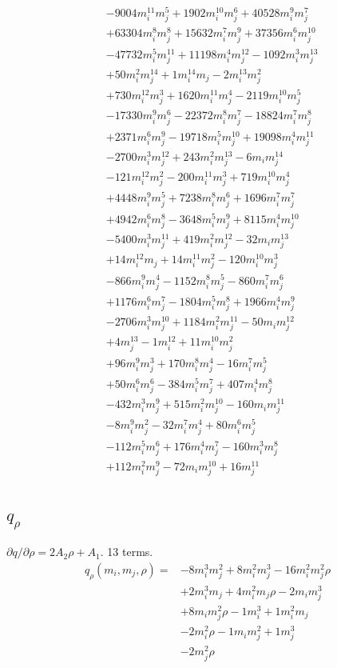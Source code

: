 {\begin{align*}
&-9004m_i^{11}m_j^{5}+1902m_i^{10}m_j^{6}+40528m_i^{9}m_j^{7}\\
&+63304m_i^{8}m_j^{8}+15632m_i^{7}m_j^{9}+37356m_i^{6}m_j^{10}\\
&-47732m_i^{5}m_j^{11}+11198m_i^{4}m_j^{12}-1092m_i^{3}m_j^{13}\\
&+50m_i^{2}m_j^{14}+1m_i^{14}m_j-2m_i^{13}m_j^{2}\\
&+730m_i^{12}m_j^{3}+1620m_i^{11}m_j^{4}-2119m_i^{10}m_j^{5}\\
&-17330m_i^{9}m_j^{6}-22372m_i^{8}m_j^{7}-18824m_i^{7}m_j^{8}\\
&+2371m_i^{6}m_j^{9}-19718m_i^{5}m_j^{10}+19098m_i^{4}m_j^{11}\\
&-2700m_i^{3}m_j^{12}+243m_i^{2}m_j^{13}-6m_im_j^{14}\\
&-121m_i^{12}m_j^{2}-200m_i^{11}m_j^{3}+719m_i^{10}m_j^{4}\\
&+4448m_i^{9}m_j^{5}+7238m_i^{8}m_j^{6}+1696m_i^{7}m_j^{7}\\
&+4942m_i^{6}m_j^{8}-3648m_i^{5}m_j^{9}+8115m_i^{4}m_j^{10}\\
&-5400m_i^{3}m_j^{11}+419m_i^{2}m_j^{12}-32m_im_j^{13}\\
&+14m_i^{12}m_j+14m_i^{11}m_j^{2}-120m_i^{10}m_j^{3}\\
&-866m_i^{9}m_j^{4}-1152m_i^{8}m_j^{5}-860m_i^{7}m_j^{6}\\
&+1176m_i^{6}m_j^{7}-1804m_i^{5}m_j^{8}+1966m_i^{4}m_j^{9}\\
&-2706m_i^{3}m_j^{10}+1184m_i^{2}m_j^{11}-50m_im_j^{12}\\
&+4m_j^{13}-1m_i^{12}+11m_i^{10}m_j^{2}\\
&+96m_i^{9}m_j^{3}+170m_i^{8}m_j^{4}-16m_i^{7}m_j^{5}\\
&+50m_i^{6}m_j^{6}-384m_i^{5}m_j^{7}+407m_i^{4}m_j^{8}\\
&-432m_i^{3}m_j^{9}+515m_i^{2}m_j^{10}-160m_im_j^{11}\\
&-8m_i^{9}m_j^{2}-32m_i^{7}m_j^{4}+80m_i^{6}m_j^{5}\\
&-112m_i^{5}m_j^{6}+176m_i^{4}m_j^{7}-160m_i^{3}m_j^{8}\\
&+112m_i^{2}m_j^{9}-72m_im_j^{10}+16m_j^{11}
\end{align*}
}

\subsection*{$q_\rho$}
$\partial q/\partial\rho=2A_2\rho+A_1$. 13 terms.
{\small
\begin{align*}
q_\rho(m_i,m_j,\rho)={}&-8m_i^{3}m_j^{2}+8m_i^{2}m_j^{3}-16m_i^{2}m_j^{2}\rho\\
&+2m_i^{3}m_j+4m_i^{2}m_j\rho-2m_im_j^{3}\\
&+8m_im_j^{2}\rho-1m_i^{3}+1m_i^{2}m_j\\
&-2m_i^{2}\rho-1m_im_j^{2}+1m_j^{3}\\
&-2m_j^{2}\rho
\end{align*}
}

